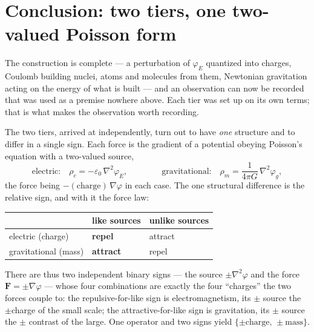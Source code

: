 \documentclass[11pt]{article}
\newcommand{\grad}{\nabla}
\begin{document}
\section{Conclusion: two tiers, one two-valued Poisson form}\label{sec:machinery}
The construction is complete --- a perturbation of $\varphi_E$ quantized into charges, Coulomb building nuclei,
atoms and molecules from them, Newtonian gravitation acting on the energy of what is built --- and an observation
can now be recorded that was used as a premise nowhere above. Each tier was set up on its own terms; that is what
makes the observation worth recording.

The two tiers, arrived at independently, turn out to have \emph{one} structure and to differ in a single sign.
Each force is the gradient of a potential obeying Poisson's equation with a two-valued source,
\begin{equation}
\text{electric:}\quad \rho_c=-\varepsilon_0\,\grad^2\varphi_E,
\qquad\qquad
\text{gravitational:}\quad \rho_m=\frac{1}{4\pi G}\,\grad^2\varphi_g,
\end{equation}
the force being $-(\text{charge})\,\grad\varphi$ in each case. The one structural difference is the relative sign,
and with it the force law:
\begin{center}
\small
\begin{tabular}{@{}lll@{}}
\toprule
 & like sources & unlike sources \\
\midrule
electric (charge) & \textbf{repel} & attract \\
gravitational (mass) & \textbf{attract} & repel \\
\bottomrule
\end{tabular}
\end{center}
There are thus two independent binary signs --- the source $\pm\grad^2\varphi$ and the force
$\mathbf F=\pm\grad\varphi$ --- whose four combinations are exactly the four ``charges'' the two forces couple to:
the repulsive-for-like sign is electromagnetism, its $\pm$ source the $\pm$charge of the small scale; the
attractive-for-like sign is gravitation, its $\pm$ source the $\pm$ contrast of the large. One operator and two
signs yield $\{\pm\text{charge},\,\pm\text{mass}\}$.
\end{document}

